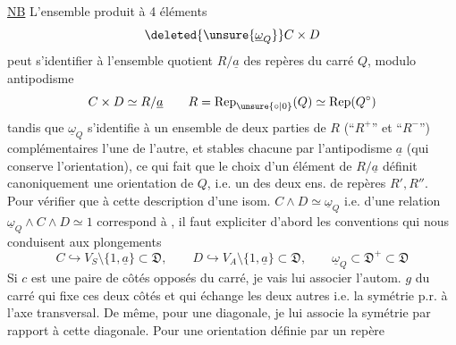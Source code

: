 \uline{NB} L'ensemble produit à 4 éléments
\[
\deleted{\unsure{\underline{\omega}_Q}} C\times D
\]
peut s'identifier à l'ensemble quotient $R/\underline{a}$ des repères du carré
$Q$, modulo antipodisme
\[
 C\times D\simeq R/\underline{a}
 \qquad R=\operatorname{Rep}_{\unsure{\circ|0}}(Q)\simeq\operatorname{Rep}(Q^\circ)
\]
tandis que $\underline{\omega}_Q$ s'identifie à
 un ensemble de deux parties de $R$ (``$R^+$'' et ``$R^-$'')
complémentaires l'une de l'autre, et stables chacune par l'antipodisme
$\underline{a}$ (qui conserve l'orientation), ce qui fait que le choix d'un
élément de $R/\underline{a}$ définit canoniquement une orientation de $Q$,
 i.e. un des deux  ens. de
repères $R',R''$.
Pour vérifier que à cette description d'une isom.
$C\wedge D\simeq\underline{\omega}_Q$ i.e. d'une relation
$\underline{\omega}_Q\wedge C\wedge D\simeq1$ correspond à
,
il faut expliciter d'abord les conventions qui nous
 conduisent aux plongements
\[
 C\hookrightarrow V_S\setminus\{1,\underline{a}\}\subset\mathfrak{D},
 \qquad D\hookrightarrow V_A\setminus\{1,\underline{a}\}\subset\mathfrak{D},
 \qquad \underline{\omega}_Q\subset\mathfrak{D}^+\subset\mathfrak{D}
\]
Si $c$ est une  paire de côtés opposés du carré,
je vais lui associer l'autom. $g$ du carré qui fixe ces deux côtés
et qui échange les deux autres i.e. la symétrie p.r. à l'axe transversal.
De même, pour une diagonale, je lui associe la symétrie par rapport à cette
diagonale. Pour une orientation définie par un repère

